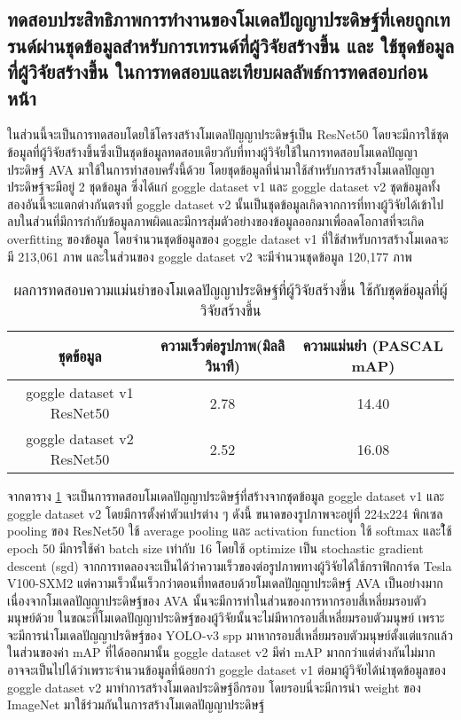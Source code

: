 \subsection{ทดสอบประสิทธิภาพการทำงานของโมเดลปัญญาประดิษฐ์ที่เคยถูกเทรนด์ผ่านชุดข้อมูลสำหรับการเทรนด์ที่ผู้วิจัยสร้างขึ้น และ ใช้ชุดข้อมูลที่ผู้วิจัยสร้างขึ้น ในการทดสอบและเทียบผลลัพธ์การทดสอบก่อนหน้า}
ในส่วนนี้จะเป็นการทดสอบโดยใช้โครงสร้างโมเดลปัญญาประดิษฐ์เป็น ResNet50 โดยจะมีการใช้ชุดข้อมูลที่ผู้วิจัยสร้างขึ้นซึ่งเป็นชุดข้อมูลทดสอบเดียวกับที่ทางผู้วิจัยใช้ในการทดสอบโมเดลปัญญาประดิษฐ์ AVA มาใช้ในการทำสอบครั้งนี้ด้วย โดยชุดข้อมูลที่นำมาใช้สำหรับการสร้างโมเดลปัญญาประดิษฐ์จะมีอยู่ 2 ชุดข้อมูล ซึ่งได้แก่ goggle dataset v1 และ goggle dataset v2 ชุดข้อมูลทั้งสองอันนี้จะแตกต่างกันตรงที่ goggle dataset v2 นั้นเป็นชุดข้อมูลเกิดจากการที่ทางผู้วิจัยได้เข้าไปลบในส่วนที่มีการกำกับข้อมูลภาพผิดและมีการสุ่มตัวอย่างของข้อมูลออกมาเพื่อลดโอกาสที่จะเกิด overfitting ของข้อมูล โดยจำนวนชุดข้อมูลของ goggle dataset v1 ที่ใช้สำหรับการสร้างโมเดลจะมี 213,061 ภาพ และในส่วนของ goggle dataset v2 จะมีจำนวนชุดข้อมูล 120,177 ภาพ
\begin{table}[!ht]
	\centering
	\begin{tabular}{|c|c|c|}
			\hline
			{ชุดข้อมูล}&{ความเร็วต่อรูปภาพ(มิลลิวินาที)}&{ความแม่นยำ (PASCAL mAP)}			\\
			\hline
			goggle dataset v1 ResNet50			& 2.78			& 14.40				\\
			goggle dataset v2 ResNet50			& 2.52			& 16.08				\\
			\hline
	\end{tabular}
\caption{ผลการทดสอบความแม่นยำของโมเดลปัญญาประดิษฐ์ที่ผู้วิจัยสร้างขึ้น ใช้กับชุดข้อมูลที่ผู้วิจัยสร้างขึ้น}
\label{tab: Test PASCAL mAP of dataset created by the researcher}
\end{table}
จากตาราง \ref{tab: Test PASCAL mAP of dataset created by the researcher} จะเป็นการทดสอบโมเดลปัญญาประดิษฐ์ที่สร้างจากชุดข้อมูล goggle dataset v1 และ goggle dataset v2 โดยมีการตั้งค่าตัวแปรต่าง ๆ ดังนี้ ขนาดของรูปภาพจะอยู่ที่ 224x224 พิกเซล pooling ของ ResNet50 ใช้ average pooling และ activation function ใช้ softmax และใ้ช้ epoch 50 มีการใช้ค่า batch size เท่ากับ 16 โดยใช้ optimize เป็น stochastic gradient descent (sgd) จากการทดลองจะเป็นได้ว่าความเร็วของต่อรูปภาพทางผู้วิจัยได้ใช้กราฟิกการ์ด Tesla V100-SXM2 แต่ความเร็วนั้นเร็วกว่าตอนที่ทดสอบด้วยโมเดลปัญญาประดิษฐ์ AVA เป็นอย่างมาก เนื่องจากโมเดลปัญญาประดิษฐ์ของ AVA นั้นจะมีการทำในส่วนของการหากรอบสี่เหลี่ยมรอบตัวมนุษย์ด้วย ในขณะที่โมเดลปัญญาประดิษฐ์ของผู้วิจัยนั้นจะไม่มีหากรอบสี่เหลี่ยมรอบตัวมนุษย์ เพราะจะมีการนำโมเดลปัญญาปรดิษฐ์ของ YOLO-v3 spp มาหากรอบสี่เหลี่ยมรอบตัวมนุษย์ตั้งแต่แรกแล้ว ในส่วนของค่า mAP ที่ได้ออกมานั้น goggle dataset v2 มีค่า mAP มากกว่าแต่ต่างกันไม่มาก อาจจะเป็นไปได้ว่าเพราะจำนวนข้อมูลที่น้อยกว่า goggle dataset v1 ต่อมาผู้วิจัยได้นำชุดข้อมูลของ goggle dataset v2 มาทำการสร้างโมเดลประดิษฐ์อีกรอบ โดยรอบนี่จะมีการนำ weight ของ ImageNet มาใช้ร่วมกันในการสร้างโมเดลปัญญาประดิษฐ์

